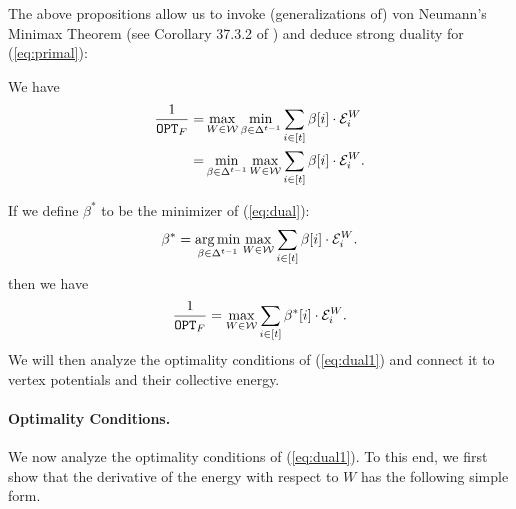 \documentclass{article}
\begin{document}
The above propositions allow us to invoke (generalizations of) von Neumann's Minimax Theorem (see Corollary 37.3.2 of \cite{Rockafellar70}) and deduce
strong duality for (\ref{eq:primal}):
\begin{proposition}
    We have
\begin{align}\label{eq:dual}
    \frac{1}{\mathtt{OPT}_F} = & \max_{W\in\mathcal{W}} \min_{\beta\in\Delta^{t-1}}
    \sum_{i\in[t]} \beta[i] \cdot \mathcal{E}_i^{W} \notag\\ = &
    \min_{\beta\in\Delta^{t-1}} \max_{W\in\mathcal{W}} 
    \sum_{i\in[t]} \beta[i] \cdot \mathcal{E}_i^{W}.
\end{align}
\end{proposition}

If we define $\beta^*$ to be the minimizer of (\ref{eq:dual}):
\begin{align*}
    \beta^* = \operatorname*{arg\,min} _{\beta\in\Delta^{t-1}}
    \max_{W\in\mathcal{W}} 
    \sum_{i\in[t]} \beta[i] \cdot \mathcal{E}_i^{W}.
\end{align*}
then we have
\begin{align}\label{eq:dual1}
    \frac{1}{\mathtt{OPT}_F} =
    \max_{W\in\mathcal{W}} 
    \sum_{i\in[t]} \beta^*[i] \cdot \mathcal{E}_i^{W}.
\end{align}
We will then analyze the optimality conditions of (\ref{eq:dual1}) and
connect it to vertex potentials and their collective energy.

\paragraph{Optimality Conditions.}

We now analyze the optimality conditions of (\ref{eq:dual1}).
To this end, we first show that the derivative of the energy with respect to $W$
has the following simple form.
\end{document}
